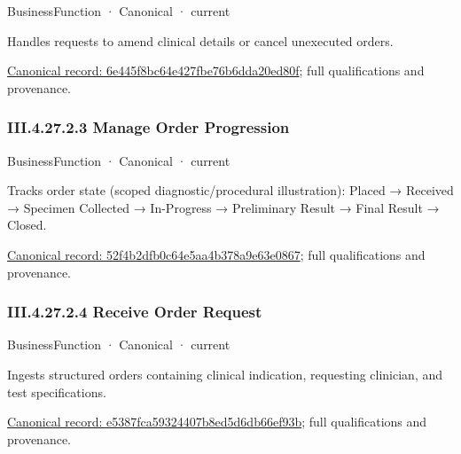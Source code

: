 \label{element:6e445f8bc64e427fbe76b6dda20ed80f}
{\small BusinessFunction · Canonical · current}\par

Handles requests to amend clinical details or cancel unexecuted orders.


{\footnotesize \href{../../../../continuum/business/business-function/6e445f8bc64e427fbe76b6dda20ed80f.md}{Canonical record: 6e445f8bc64e427fbe76b6dda20ed80f}; full qualifications and provenance.}\par
\subsubsection*{III.4.27.2.3 Manage Order Progression}
\label{navigation:III.4.27.2.3}

\label{element:52f4b2dfb0c64e5aa4b378a9e63e0867}
{\small BusinessFunction · Canonical · current}\par

Tracks order state (scoped diagnostic/procedural illustration): Placed → Received → Specimen Collected → In-Progress → Preliminary Result → Final Result → Closed.


{\footnotesize \href{../../../../continuum/business/business-function/52f4b2dfb0c64e5aa4b378a9e63e0867.md}{Canonical record: 52f4b2dfb0c64e5aa4b378a9e63e0867}; full qualifications and provenance.}\par
\subsubsection*{III.4.27.2.4 Receive Order Request}
\label{navigation:III.4.27.2.4}

\label{element:e5387fca59324407b8ed5d6db66ef93b}
{\small BusinessFunction · Canonical · current}\par

Ingests structured orders containing clinical indication, requesting clinician, and test specifications.


{\footnotesize \href{../../../../continuum/business/business-function/e5387fca59324407b8ed5d6db66ef93b.md}{Canonical record: e5387fca59324407b8ed5d6db66ef93b}; full qualifications and provenance.}\par
